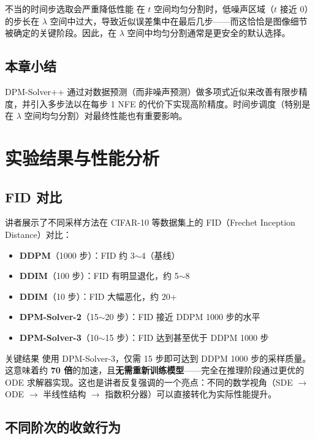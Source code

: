 \documentclass[a4paper]{article}
\begin{document}
\begin{warningbox}{不当的时间步选取会严重降低性能}
在 $t$ 空间均匀分割时，低噪声区域（$t$ 接近 0）的步长在 $\lambda$ 空间中过大，导致近似误差集中在最后几步——而这恰恰是图像细节被确定的关键阶段。因此，在 $\lambda$ 空间中均匀分割通常是更安全的默认选择。
\end{warningbox}

\subsection{本章小结}

DPM-Solver++ 通过对数据预测（而非噪声预测）做多项式近似来改善有限步精度，并引入多步法以在每步 1 NFE 的代价下实现高阶精度。时间步调度（特别是在 $\lambda$ 空间均匀分割）对最终性能也有重要影响。


\section{实验结果与性能分析}

\subsection{FID 对比}

讲者展示了不同采样方法在 CIFAR-10 等数据集上的 FID（Frechet Inception Distance）对比：

\begin{itemize}
    \item \textbf{DDPM}（1000 步）：FID 约 3$\sim$4（基线）
    \item \textbf{DDIM}（100 步）：FID 有明显退化，约 5$\sim$8
    \item \textbf{DDIM}（10 步）：FID 大幅恶化，约 20+
    \item \textbf{DPM-Solver-2}（15$\sim$20 步）：FID 接近 DDPM 1000 步的水平
    \item \textbf{DPM-Solver-3}（10$\sim$15 步）：FID 达到甚至优于 DDPM 1000 步
\end{itemize}

\begin{importantbox}{关键结果}
使用 DPM-Solver-3，仅需 15 步即可达到 DDPM 1000 步的采样质量。这意味着约 \textbf{70 倍}的加速，且\textbf{无需重新训练模型}——完全在推理阶段通过更优的 ODE 求解器实现。这也是讲者反复强调的一个亮点：不同的数学视角（SDE $\to$ ODE $\to$ 半线性结构 $\to$ 指数积分器）可以直接转化为实际性能提升。
\end{importantbox}

\subsection{不同阶次的收敛行为}
\end{document}
